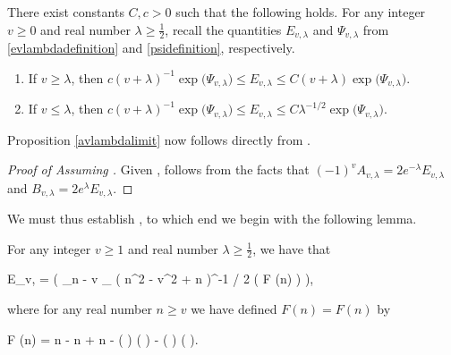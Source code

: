     \begin{proposition}
    
    \label{estimateevlambda} 
    
    There exist constants $C, c > 0$ such that the following holds. For any integer $v \ge 0$ and real number $\lambda \ge \frac{1}{2}$, recall the quantities $E_{v, \lambda}$ and $\Psi_{v, \lambda}$ from \eqref{evlambdadefinition} and \eqref{psidefinition}, respectively. 
    
    \begin{enumerate}
    	\item If $v \ge \lambda$, then $c (v + \lambda)^{-1} \exp \big( \Psi_{v, \lambda} \big) \le E_{v, \lambda} \le C (v + \lambda) \exp \big( \Psi_{v, \lambda} \big)$.
		
	\item If $v \le \lambda$, then $c (v + \lambda)^{-1} \exp \big( \Psi_{v, \lambda} \big) \le E_{v, \lambda} \le C \lambda^{-1/2} \exp \big( \Psi_{v, \lambda} \big)$.
		
	\end{enumerate} 
	\end{proposition}
	
	Proposition \ref{avlambdalimit} now follows directly from . 

	\begin{proof}[Proof of  Assuming ]

    Given ,  follows from the facts that $(-1)^v A_{v, \lambda} = 2 e^{-\lambda} E_{v, \lambda}$ and $B_{v, \lambda} = 2 e^{\lambda} E_{v, \lambda}$.
    \end{proof}
	
	We must thus establish , to which end we begin with the following lemma. 
	
	\begin{lemma} 
	
	\label{estimateevlambda1} 
	
	For any integer $v \ge 1$ and real number $\lambda \ge \frac{1}{2}$, we have that
	\begin{flalign}
	\label{evlambdafestimate} 
	E_{v, \lambda} = \Theta \Bigg( \displaystyle\sum_{n - v  _{}} \big( n^2 - v^2 + n \big)^{-1 / 2} \exp \big( F (n) \big) \Bigg),
	\end{flalign}
	
	\noindent where for any real number $n \ge v$ we have defined $F (n) = F (n)$ by 
	\begin{flalign}
	\label{f}
	F (n) = n \log \lambda - n  + n - \Big(  \Big) \log \Big(  \Big) - \Big(  \Big) \log \Big(  \Big).
	\end{flalign}
	
	\end{lemma} 
	
